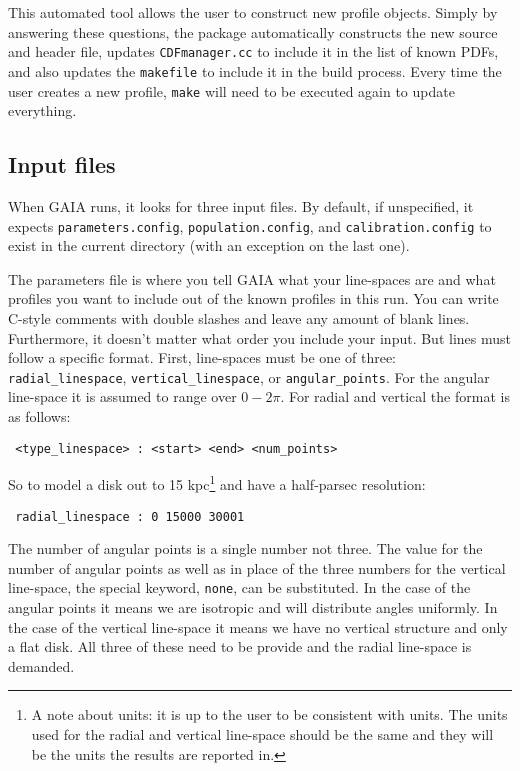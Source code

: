 \documentclass[10pt,a4paper,final]{article}
\numberwithin{equation}{section}
\begin{document}
\begin{multicols}{2}[]
			This automated tool allows the user to construct new profile objects. Simply
			by answering these questions, the package automatically constructs the new
			source and header file, updates \texttt{CDFmanager.cc} to include it
			in the list of known PDFs, and also updates the \texttt{makefile} to include
			it in the build process. Every time the user creates a new profile, 
			\texttt{make} will need to be executed again to update everything.

		\subsection{Input files}

			When GAIA runs, it looks for three input files. By default, if unspecified,
			it expects \texttt{parameters.config}, \texttt{population.config}, and
			\texttt{calibration.config} to exist in the current directory (with an
			exception on the last one).

			The parameters file is where you tell GAIA what your line-spaces are and
			what profiles you want to include out of the known profiles in this run.
			You can write C-style comments with double slashes and leave any amount
			of blank lines. Furthermore, it doesn't matter what order you include
			your input. But lines must follow a specific format. First, line-spaces
			must be one of three: \texttt{radial\_linespace}, \texttt{vertical\_linespace},
			or \texttt{angular\_points}. For the angular line-space it is assumed to range
			over $0 - 2\pi$. For radial and vertical the format is as follows:

			\begin{center}
				\texttt{ <type\_linespace> : <start> <end> <num\_points> }
			\end{center}

			So to model a disk out to 15 kpc\footnote{A note about units: 
			it is up to the user to be consistent with units. The units 
			used for the radial and vertical line-space should be the same
			and they will be the units the results are reported in.}
			and have a half-parsec resolution:

			\begin{center}
				\texttt{ radial\_linespace : 0 15000 30001 }
			\end{center}
			
			The number of angular points is a single number not three. The value for the 
			number of angular points as well as in place of the three numbers for the
			vertical line-space, the special keyword, \texttt{none}, can be substituted.
			In the case of the angular points it means we are isotropic and will
			distribute angles uniformly. In the case of the vertical line-space it means
			we have no vertical structure and only a flat disk. All three of these
			need to be provide and the radial line-space is demanded.


\end{multicols}
\end{document}
